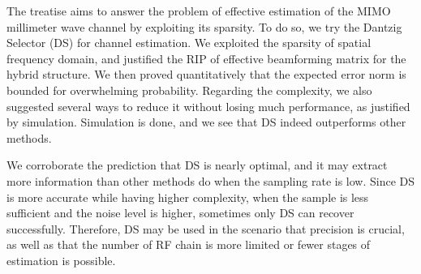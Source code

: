 
\startchapter [title={Conclusion}]

The treatise aims to answer the problem of effective estimation of the MIMO millimeter wave channel by exploiting its sparsity.
To do so, we try the Dantzig Selector (DS) for channel estimation.
We exploited the sparsity of spatial frequency domain, and justified the RIP of effective beamforming matrix for the hybrid structure.
We then proved quantitatively that the expected error norm is bounded for overwhelming probability.
Regarding the complexity, we also suggested several ways to reduce it without losing much performance, as justified by simulation.
Simulation is done, and we see that DS indeed outperforms other methods.

We corroborate the prediction that DS is nearly optimal, and it may extract more information than other methods do when the sampling rate is low.
Since DS is more accurate while having higher complexity, when the sample is less sufficient and the noise level is higher, sometimes only DS can recover successfully.
Therefore, DS may be used in the scenario that precision is crucial, as well as that the number of RF chain is more limited or fewer stages of estimation is possible.


\stopchapter


